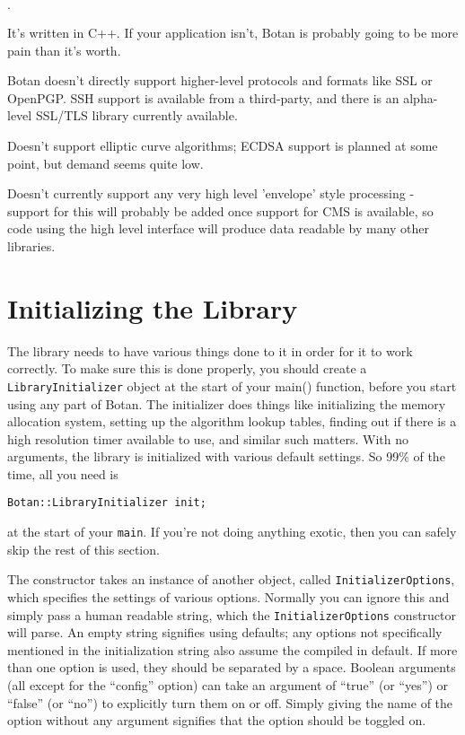 \documentclass{article}
\newcommand{\type}[1]{\texttt{#1}}
\begin{document}
\begin{list}{$\cdot$}
  \item It's written in C++. If your application isn't, Botan is probably
        going to be more pain than it's worth.
  \item

  \item Botan doesn't directly support higher-level protocols and
        formats like SSL or OpenPGP. SSH support is available from a
        third-party, and there is an alpha-level SSL/TLS library
        currently available.

  \item Doesn't support elliptic curve algorithms; ECDSA support is planned at
        some point, but demand seems quite low.

  \item Doesn't currently support any very high level 'envelope' style
        processing - support for this will probably be added once support for
        CMS is available, so code using the high level interface will produce
        data readable by many other libraries.
\end{list}

\pagebreak

\section{Initializing the Library}

The library needs to have various things done to it in order for it to
work correctly. To make sure this is done properly, you should create
a \type{LibraryInitializer} object at the start of your main()
function, before you start using any part of Botan. The initializer
does things like initializing the memory allocation system, setting up
the algorithm lookup tables, finding out if there is a high resolution
timer available to use, and similar such matters. With no arguments,
the library is initialized with various default settings. So 99\% of
the time, all you need is

\texttt{Botan::LibraryInitializer init;}

at the start of your \texttt{main}. If you're not doing anything
exotic, then you can safely skip the rest of this section.

The constructor takes an instance of another object, called
\type{InitializerOptions}, which specifies the settings of various
options. Normally you can ignore this and simply pass a human readable
string, which the \type{InitializerOptions} constructor will parse. An
empty string signifies using defaults; any options not specifically
mentioned in the initialization string also assume the compiled in
default.
If more than one option is used, they should be separated by a
space. Boolean arguments (all except for the ``config'' option) can
take an argument of ``true'' (or ``yes'') or ``false'' (or ``no'') to
explicitly turn them on or off. Simply giving the name of the option
without any argument signifies that the option should be toggled on.
\end{document}
